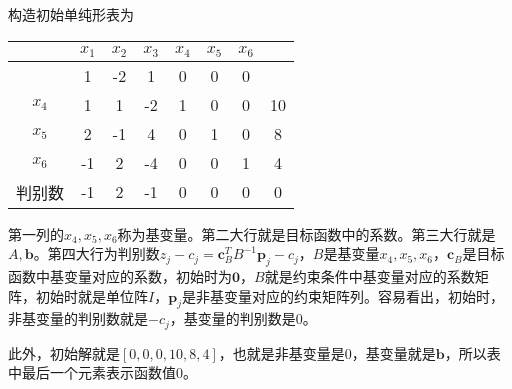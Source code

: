 \begin{solution}

构造初始单纯形表为
\begin{longtable}{c|cccccc|c}
	      & $x_1$ & $x_2$ & $x_3$ & $x_4$ & $x_5$ & $x_6$ &   \\ \hline
	& 1 & -2 & 1 & 0& 0 & 0&      \\ \hline
	$x_4$ &   1   &  1     &   -2    &  1    &   0    &  0     & 10  \\
	$x_5$ &   2   &   -1    &  4    &    0   &   1    &   0    &  8 \\
	$x_6$ &  -1   &     2  &   -4   &    0   &   0    &   1   & 4 \\ \hline
	   判别数   &  -1   &   2   &  -1   &   0   &   0   &   0   & 0
\end{longtable}
第一列的$x_4,x_5,x_6$称为基变量。第二大行就是目标函数中的系数。第三大行就是$A,\bm{b}$。第四大行为判别数$z_j-c_j=\bm{c}_B^TB^{-1}\bm{p}_j-c_j$，$B$是基变量$x_4,x_5,x_6$，$\bm{c}_B$是目标函数中基变量对应的系数，初始时为$\bm{0}$，$B$就是约束条件中基变量对应的系数矩阵，初始时就是单位阵$I$，$\bm{p}_j$是非基变量对应的约束矩阵列。容易看出，初始时，非基变量的判别数就是$-c_j$，基变量的判别数是0。

此外，初始解就是$[0,0,0,10,8,4]$，也就是非基变量是0，基变量就是$\bm{b}$，所以表中最后一个元素表示函数值0。


\end{solution}
